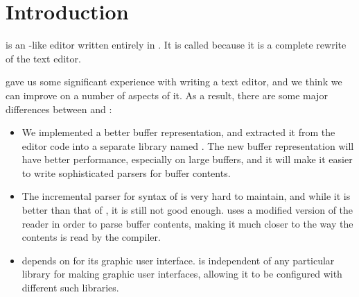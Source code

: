 \chapter{Introduction}

\sysname{} is an \emacs{}-like editor written entirely in
\commonlisp{}.  It is called \sysname{} because it is a complete
rewrite of the \climacs{} text editor.

\climacs{} gave us some significant experience with writing a text
editor, and we think we can improve on a number of aspects of it.  As
a result, there are some major differences between \climacs{} and
\sysname{}:

\begin{itemize}
\item We implemented a better buffer representation, and extracted it
  from the editor code into a separate library named \cluffer{}.  The
  new buffer representation will have better performance, especially
  on large buffers, and it will make it easier to write sophisticated
  parsers for buffer contents.
\item The incremental parser for \commonlisp{} syntax of \climacs{} is
  very hard to maintain, and while it is better than that of \emacs{},
  it is still not good enough.  \sysname{} uses a modified version of
  the \commonlisp{} reader in order to parse buffer contents, making
  it much closer to the way the contents is read by the \commonlisp{}
  compiler.
\item \climacs{} depends on \mcclim{} for its graphic user interface.
  \sysname{} is independent of any particular library for making
  graphic user interfaces, allowing it to be configured with different
  such libraries.
\end{itemize}
